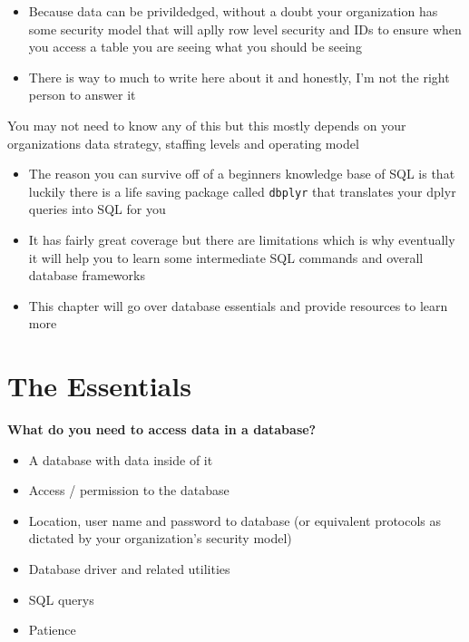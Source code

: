\documentclass[
  letterpaper,
  DIV=11,
  numbers=noendperiod]{scrreprt}
\providecommand{\tightlist}{%
  \setlength{\itemsep}{0pt}\setlength{\parskip}{0pt}}\usepackage{longtable,booktabs,array}
\begin{document}
\begin{tcolorbox}
\begin{itemize}
  \begin{itemize}
  \tightlist
  \item
    Because data can be privildedged, without a doubt your organization
    has some security model that will aplly row level security and IDs
    to ensure when you access a table you are seeing what you should be
    seeing
  \item
    There is way to much to write here about it and honestly, I'm not
    the right person to answer it
  \end{itemize}
\end{itemize}

You may not need to know any of this but this mostly depends on your
organizations data strategy, staffing levels and operating model

\end{tcolorbox}

\begin{itemize}
\item
  The reason you can survive off of a beginners knowledge base of SQL is
  that luckily there is a life saving package called \texttt{dbplyr}
  that translates your dplyr queries into SQL for you
\item
  It has fairly great coverage but there are limitations which is why
  eventually it will help you to learn some intermediate SQL commands
  and overall database frameworks
\item
  This chapter will go over database essentials and provide resources to
  learn more
\end{itemize}

\section{The Essentials}\label{the-essentials}

\textbf{What do you need to access data in a database?}

\begin{itemize}
\tightlist
\item
  A database with data inside of it\\
\item
  Access / permission to the database
\item
  Location, user name and password to database (or equivalent protocols
  as dictated by your organization's security model)
\item
  Database driver and related utilities
\item
  SQL querys
\item
  Patience
\end{itemize}
\end{document}
